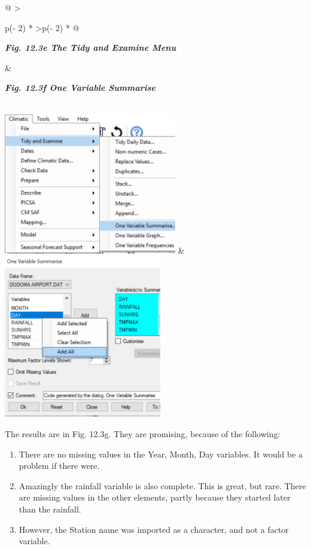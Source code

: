 \documentclass[
  letterpaper,
  DIV=11,
  numbers=noendperiod]{scrreprt}
\begin{document}
\begin{longtable}[]{@{}
  >{\raggedright\arraybackslash}p{(\columnwidth - 2\tabcolsep) * }
  >{\raggedleft\arraybackslash}p{(\columnwidth - 2\tabcolsep) * }@{}}
\toprule\noalign{}
\begin{minipage}[b]{\linewidth}\raggedright
\textbf{\emph{Fig. 12.3e The Tidy and Examine Menu}}
\end{minipage} & \begin{minipage}[b]{\linewidth}\raggedleft
\textbf{\emph{Fig. 12.3f One Variable Summarise}}
\end{minipage} \\
\midrule\noalign{}
\endhead
\bottomrule\noalign{}
\endlastfoot
\includegraphics[width=2.9703in,height=2.42695in]{figures/Fig12.3e.png}
&
\includegraphics[width=2.71051in,height=2.80483in]{figures/Fig12.3f.png} \\
\end{longtable}

The results are in Fig. 12.3g. They are promising, because of the
following:

\begin{enumerate}
\def\labelenumi{\alph{enumi})}
\item
  There are no missing values in the Year, Month, Day variables. It
  would be a problem if there were.
\item
  Amazingly the rainfall variable is also complete. This is great, but
  rare. There are missing values in the other elements, partly because
  they started later than the rainfall.
\item
  However, the Station name was imported as a character, and not a
  factor variable.
\end{enumerate}
\end{document}
